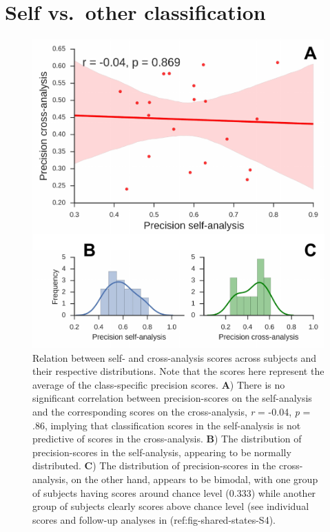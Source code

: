 \documentclass[12pt,american,a4paper,oneside,]{memoir} %
\begin{document}
\newpage
\pagestyle{empty}

\hypertarget{self-vs.-other-classification}{%
\section{Self vs.~other classification}\label{self-vs.-other-classification}}


\begin{figure}
\centering
\includegraphics{_bookdown_files/shared-states-files/figures/figure_S6.pdf}
\caption{\label{fig:fig-shared-states-S6}Relation between self- and cross-analysis scores across subjects and their respective distributions. Note that the scores here represent the average of the class-specific precision scores. \textbf{A}) There is no significant correlation between precision-scores on the self-analysis and the corresponding scores on the cross-analysis, \emph{r} = -0.04, \emph{p} = .86, implying that classification scores in the self-analysis is not predictive of scores in the cross-analysis. \textbf{B}) The distribution of precision-scores in the self-analysis, appearing to be normally distributed. \textbf{C}) The distribution of precision-scores in the cross-analysis, on the other hand, appears to be bimodal, with one group of subjects having scores around chance level (0.333) while another group of subjects clearly scores above chance level (see individual scores and follow-up analyses in (ref:fig-shared-states-S4).}
\end{figure}
\end{document}
